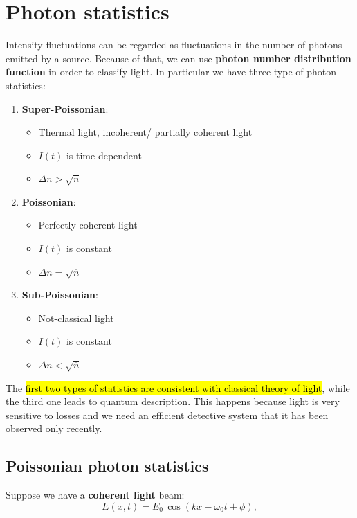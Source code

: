 \section{Photon statistics}\label{sec:photon-statistics}
Intensity fluctuations can be regarded as fluctuations in the number of photons emitted by a source. Because of that, we can use \textbf{photon number distribution function} in order to classify light. In particular we have three type of photon statistics:

\begin{enumerate}
    \item \textbf{Super-Poissonian}: 
    \begin{itemize}
        \item Thermal light, incoherent/ partially coherent light 
        \item $I(t)$ is time dependent
        \item $\Delta n > \sqrt{\overline{n}}$
    \end{itemize}
    \item \textbf{Poissonian}: 
    \begin{itemize}
        \item Perfectly coherent light 
        \item $I(t)$ is constant
        \item $\Delta n = \sqrt{\overline{n}}$
    \end{itemize}
    \item \textbf{Sub-Poissonian}: 
    \begin{itemize}
        \item Not-classical light 
        \item $I(t)$ is constant
        \item $\Delta n <\sqrt{\overline{n}}$
    \end{itemize}
\end{enumerate}



The \hl{first two types of statistics are consistent with classical theory of light}, while the third one leads to quantum description. This happens because light is very sensitive to losses and we need an efficient detective system that it has been observed only recently.

\subsection{Poissonian photon statistics}\label{subsec:poissonian-light}
Suppose we have a \textbf{coherent light} beam:
\[
E(x,t) = E_0 \, \cos(kx-\omega_0 t + \phi),
\]

